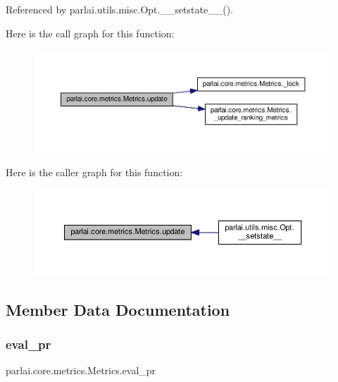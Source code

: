 Referenced by parlai.\+utils.\+misc.\+Opt.\+\_\+\+\_\+setstate\+\_\+\+\_\+().

Here is the call graph for this function\+:
\nopagebreak
\begin{figure}[H]
\begin{center}
\leavevmode
\includegraphics[width=350pt]{classparlai_1_1core_1_1metrics_1_1Metrics_ab1a5a659f2c5747af5d0b674dc647742_cgraph}
\end{center}
\end{figure}
Here is the caller graph for this function\+:
\nopagebreak
\begin{figure}[H]
\begin{center}
\leavevmode
\includegraphics[width=350pt]{classparlai_1_1core_1_1metrics_1_1Metrics_ab1a5a659f2c5747af5d0b674dc647742_icgraph}
\end{center}
\end{figure}


\subsection{Member Data Documentation}
\mbox{\label{classparlai_1_1core_1_1metrics_1_1Metrics_a6bf169112945fa8e28547e8c4464b5d6}} 
\subsubsection{\texorpdfstring{eval\+\_\+pr}{eval\_pr}}
{\footnotesize\ttfamily parlai.\+core.\+metrics.\+Metrics.\+eval\+\_\+pr}



